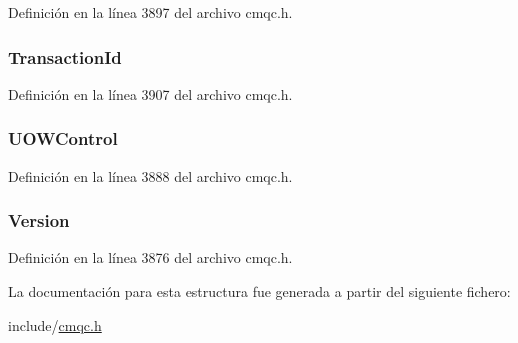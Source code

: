 Definición en la línea 3897 del archivo cmqc.\+h.

\hypertarget{structtag_m_q_c_i_h_ab2acc4f098793a1be4bd7c68e71067ab}{}
\subsubsection[{Transaction\+Id}]{ Transaction\+Id}\label{structtag_m_q_c_i_h_ab2acc4f098793a1be4bd7c68e71067ab}


Definición en la línea 3907 del archivo cmqc.\+h.

\hypertarget{structtag_m_q_c_i_h_ad721adaa57421010df92b056901c4420}{}
\subsubsection[{U\+O\+W\+Control}]{ U\+O\+W\+Control}\label{structtag_m_q_c_i_h_ad721adaa57421010df92b056901c4420}


Definición en la línea 3888 del archivo cmqc.\+h.

\hypertarget{structtag_m_q_c_i_h_a0656ef8f766b3907d394d88a35d7b7e9}{}
\subsubsection[{Version}]{ Version}\label{structtag_m_q_c_i_h_a0656ef8f766b3907d394d88a35d7b7e9}


Definición en la línea 3876 del archivo cmqc.\+h.



La documentación para esta estructura fue generada a partir del siguiente fichero\+:\begin{DoxyCompactItemize}
\item 
include/\hyperlink{cmqc_8h}{cmqc.\+h}\end{DoxyCompactItemize}
